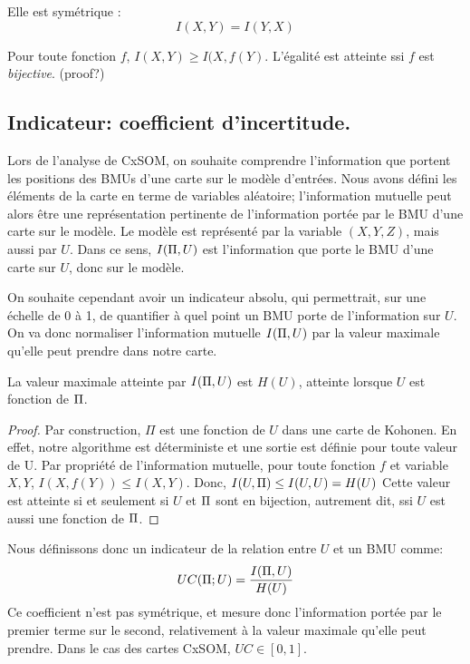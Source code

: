 Elle est symétrique : $$I(X,Y) = I(Y,X)$$

Pour toute fonction $f$, $I(X,Y) \geq I(X,f(Y)$. L'égalité est atteinte ssi $f$ est \emph{bijective}. (proof?)

\subsection{Indicateur: coefficient d'incertitude.}

Lors de l'analyse de CxSOM, on souhaite comprendre l'information que portent les positions des BMUs d'une carte sur le modèle d'entrées. Nous avons défini les éléments de la carte en terme de variables aléatoire; l'information mutuelle peut alors être une représentation pertinente de l'information portée par le BMU d'une carte sur le modèle. Le modèle est représenté par la variable $(X,Y,Z)$, mais aussi par $U$. Dans ce sens, $I(\Pi, U)$ est l'information que porte le BMU d'une carte sur $U$, donc sur le modèle. 

On souhaite cependant avoir un indicateur absolu, qui permettrait, sur une échelle de 0 à 1, de quantifier à quel point un BMU porte de l'information sur $U$. On va donc normaliser l'information mutuelle $I(\Pi,U)$ par la valeur maximale qu'elle peut prendre dans notre carte.
\begin{propriete}
La valeur maximale atteinte par $I(\Pi,U)$ est $H(U)$, atteinte lorsque $U$ est fonction de $\Pi$.
\end{propriete}

\begin{proof}
Par construction, $\Pi$ est une fonction de $U$ dans une carte de Kohonen. En effet, notre algorithme est déterministe et une sortie est définie pour toute valeur de U. 
Par propriété de l'information mutuelle, pour toute fonction $f$ et variable $X,Y$, $I(X,f(Y)) \leq I(X,Y) $.
Donc, $I(U,\Pi) \leq I(U,U) = H(U)$
Cette valeur est atteinte si et seulement si $U$ et $\Pi$ sont en bijection, autrement dit, ssi $U$ est aussi une fonction de $\Pi$.
\end{proof}

Nous définissons donc un indicateur de la relation entre $U$ et un BMU comme:
\begin{equation}
UC(\Pi;U) = \frac{I(\Pi,U)}{H(U)}
\end{equation}
Ce coefficient n'est pas symétrique, et mesure donc l'information portée par le premier terme sur le second, relativement à la valeur maximale qu'elle peut prendre. Dans le cas des cartes CxSOM, $UC \in [0,1]$. 

